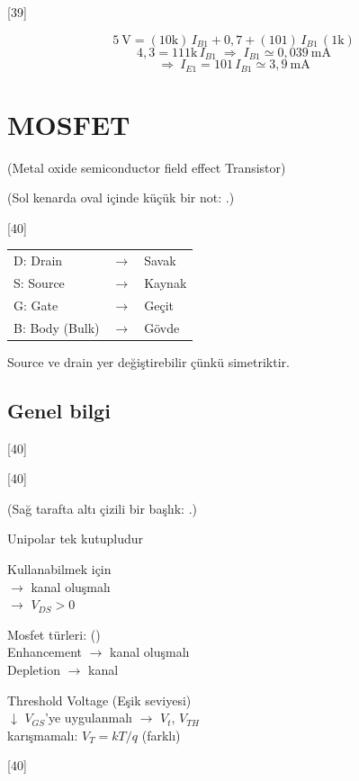 \documentclass[11pt,a4paper]{article}
\begin{document}
[39]

\begin{cozum}
\[ 5\ \mathrm{V} = (10\mathrm{k})\,I_{B1}+0{,}7+(101)\,I_{B1}\,(1\mathrm{k}) \]
\[ 4{,}3 = 111\mathrm{k}\,I_{B1} \;\Rightarrow\; I_{B1} \simeq 0{,}039\ \mathrm{mA} \]
\[ \Rightarrow\ I_{E1} = 101\,I_{B1} \simeq 3{,}9\ \mathrm{mA} \]
\end{cozum}

\section{MOSFET}
(Metal oxide semiconductor field effect Transistor)

{\small\color{kursunkalem}(Sol kenarda oval içinde küçük bir not: .)}

[40]

\begin{tabular}{@{}lcl@{}}
D: Drain & $\rightarrow$ & Savak \\
S: Source & $\rightarrow$ & Kaynak \\
G: Gate & $\rightarrow$ & Geçit \\
B: Body (Bulk) & $\rightarrow$ & Gövde
\end{tabular}

Source ve drain yer değiştirebilir çünkü simetriktir.

\subsection*{Genel bilgi}
[40]

[40]

{\small\color{kursunkalem}(Sağ tarafta altı çizili bir başlık: .)}

Unipolar tek kutupludur

Kullanabilmek için\\
$\rightarrow$ kanal oluşmalı\\
$\rightarrow$ $V_{DS} > 0$

Mosfet türleri: {\small\color{kursunkalem}()}\\
Enhancement $\rightarrow$ kanal oluşmalı\\
Depletion $\rightarrow$ kanal 

Threshold Voltage (Eşik seviyesi)\\
$\downarrow$ $V_{GS}$'ye uygulanmalı $\rightarrow$ $V_t$, $V_{TH}$\\
karışmamalı: $V_T = kT/q$ (farklı)

[40]
\end{document}
